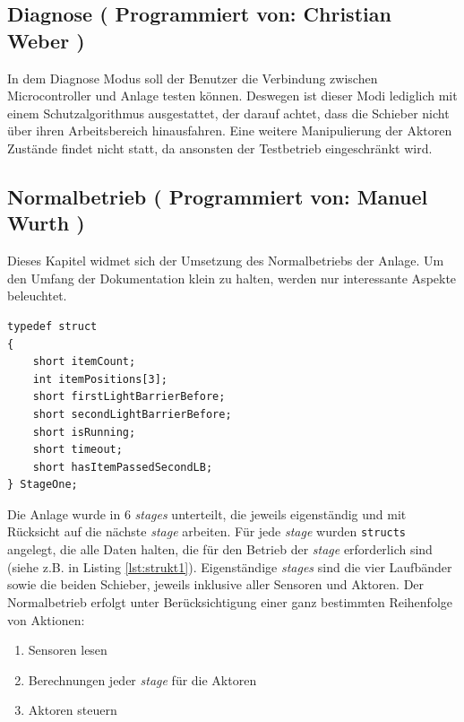 \documentclass[fontsize=11pt,a4paper,final]{scrartcl}[2003/01/01]
\newcommand*{\manu}{%
	Programmiert von: Manuel Wurth
}
\newcommand*{\chris}{%
	Programmiert von: Christian Weber
}
\begin{document}
\subsection{Diagnose (\chris)}
In dem Diagnose Modus soll der Benutzer die Verbindung zwischen Microcontroller und Anlage testen können. Deswegen ist dieser Modi lediglich mit einem Schutzalgorithmus ausgestattet, der darauf achtet, dass die Schieber nicht über ihren Arbeitsbereich hinausfahren. Eine weitere Manipulierung der Aktoren Zustände findet nicht statt, da ansonsten der Testbetrieb eingeschränkt wird.


\subsection{Normalbetrieb (\manu)}
Dieses Kapitel widmet sich der Umsetzung des Normalbetriebs der Anlage. Um den Umfang der Dokumentation klein zu halten, werden nur interessante Aspekte beleuchtet.
\begin{lstlisting}[caption={Beispiel: Struct für die erste \textit{stage} (erstes Laufband)},label={lst:strukt1}]
typedef struct
{
	short itemCount;
	int itemPositions[3];
	short firstLightBarrierBefore;
	short secondLightBarrierBefore;
	short isRunning;
	short timeout;
	short hasItemPassedSecondLB;
} StageOne;
\end{lstlisting} 
Die Anlage wurde in 6 \textit{stages} unterteilt, die jeweils eigenständig und mit Rücksicht auf die nächste \textit{stage} arbeiten. Für jede \textit{stage} wurden \lstinline|structs| angelegt, die alle Daten halten, die für den Betrieb der \textit{stage} erforderlich sind (siehe z.B. in Listing \ref{lst:strukt1}). Eigenständige \textit{stages} sind die vier Laufbänder sowie die beiden Schieber, jeweils inklusive aller Sensoren und Aktoren. Der Normalbetrieb erfolgt unter Berücksichtigung einer ganz bestimmten Reihenfolge von Aktionen:
\begin{enumerate}
\item Sensoren lesen
\item Berechnungen jeder \textit{stage} für die Aktoren
\item Aktoren steuern
\end{enumerate}
\end{document}
